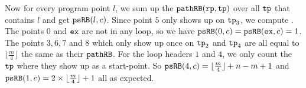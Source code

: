 Now for every program point $l$, we sum up the $\mathtt{pathRB}(\mathtt{rp}, \mathtt{tp})$ over all $\mathtt{tp}$ that contains $l$ and get $\mathtt{psRB}(l, c)$.
Since point $5$ only shows up on $\mathtt{tp}_3$, we compute .
The points $0$ and $\mathtt{ex}$ are not in any loop, so we have $\mathtt{psRB}(0, c) = \mathtt{psRB}(\mathtt{ex}, c) = 1$.
The points $3, 6, 7$ and $8$ which only show up once on $\mathtt{tp}_2$ and $\mathtt{tp}_4$ are all equal to $\lfloor\frac{m}{4}\rfloor$ the same as their $\mathtt{pathRB}$.
For the loop headers $1$ and $4$, we only count the $\mathtt{tp}$ where they show up as a start-point.
So $\mathtt{psRB}(4, c) = \lfloor\frac{m}{4}\rfloor + n - m + 1$ and $\mathtt{psRB}(1,c) = 2 \times \lfloor\frac{m}{4}\rfloor + 1$ all as expected.